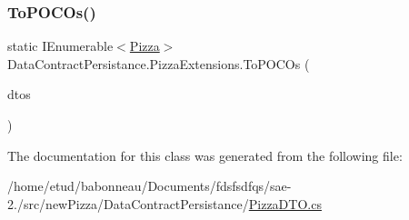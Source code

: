 \mbox{\label{classDataContractPersistance_1_1PizzaExtensions_a45435c062a8390d7459cc3af348f23e5}} 
\subsubsection{\texorpdfstring{To\+P\+O\+C\+Os()}{ToPOCOs()}\hspace{0.1cm}{\footnotesize\ttfamily [2/2]}}
{\footnotesize\ttfamily static I\+Enumerable$<$\hyperlink{classModele_1_1Pizza}{Pizza}$>$ Data\+Contract\+Persistance.\+Pizza\+Extensions.\+To\+P\+O\+C\+Os (\begin{DoxyParamCaption}\item[{this I\+Enumerable$<$ \hyperlink{classDataContractPersistance_1_1PizzaDTO}{Pizza\+D\+TO} $>$}]{dtos }\end{DoxyParamCaption})\hspace{0.3cm}{\ttfamily [static]}}



The documentation for this class was generated from the following file\+:\begin{DoxyCompactItemize}
\item 
/home/etud/babonneau/\+Documents/fdsfsdfqs/sae-\/2./src/new\+Pizza/\+Data\+Contract\+Persistance/\hyperlink{PizzaDTO_8cs}{Pizza\+D\+T\+O.\+cs}\end{DoxyCompactItemize}
